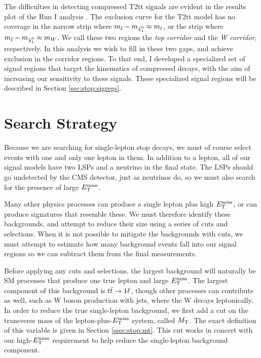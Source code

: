 The difficulties in detecting compressed T2tt signals are evident in
the results plot of the Run I analysis \cite{run1stop1l}. The exclusion
curve for the T2tt model has no coverage in the narrow strip where
$m_{\tilde{t}} - m_{\tilde{\chi}^0_1} \approx m_t$, or the strip where $m_{\tilde{t}} - m_{\tilde{\chi}^0_1}
\approx m_W$. We call these two regions the \emph{top corridor} and
the \emph{W corridor}, respectively. In this analysis we wish to
fill in these two gaps, and achieve exclusion in the corridor
regions. To that end, I developed a specialized set of
signal regions that target the kinematics of compressed decays, with
the aim of increasing our sensitivity to these signals. These
specialized signal regions will be described in Section
\ref{sec:stop:sigregs}.

\section{Search Strategy}
\label{sec:stop:searchstrategy}

Because we are searching for single-lepton stop decays, we must of
course select events with one and only one lepton in them. In addition
to a lepton, all of our signal models have two LSPs and a neutrino in
the final state. The LSPs should go undetected by the CMS detector,
just as neutrinos do, so we must also search for the presence of large $E_\text{T}^\text{miss}$.

Many other physics processes can produce a single lepton plus high
$E_\text{T}^\text{miss}$, or can produce signatures that resemble these. We must therefore
identify these backgrounds, and attempt to reduce their size using
a series of cuts and selections. When it is not possible to mitigate
the backgrounds with cuts, we must attempt to estimate how many
background events fall into our signal regions so we can subtract them
from the final measurements.

Before applying any cuts and selections, the largest
background will naturally be SM processes that produce one true lepton
and large $E_\text{T}^\text{miss}$. The largest component of this background is $t\bar{t} \rightarrow 1\ell$,
though other processes can contribute as well, such as W boson production
with jets, where the W decays leptonically. In order to reduce the
true single-lepton background, we first add a cut on the transverse mass of the
lepton-plus-$E_\text{T}^\text{miss}$ system, called $M_\text{T}$. The exact definition of this variable is
given in Section \ref{ssec:stop:mt}. This cut works in
concert with our high-$E_\text{T}^\text{miss}$ requirement to help reduce the single-lepton
background component.

